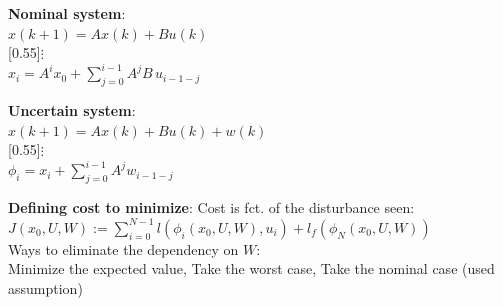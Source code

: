 \noindent
\begin{minipage}{\linewidth}
  \begin{minipage}[t]{0.48\linewidth}
    \vspace{0pt}
    \textbf{Nominal system}:\\
    \(x(k+1)=Ax(k)+Bu(k)\)\\[-1mm]
    \scalebox{1}[0.55]{\(\vdots\)}\\[-1mm]
    \(x_i=A^i x_0+\displaystyle\sum_{j=0}^{i-1}A^jB\,u_{i-1-j}\)
  \end{minipage}%
  \hfill
  \begin{minipage}[t]{0.48\linewidth}
    \vspace{0pt}
    \textbf{Uncertain system}:\\
    \(x(k+1)=Ax(k)+Bu(k)+w(k)\)\\[-1mm]
    \scalebox{1}[0.55]{\(\vdots\)}\\[-1mm]
    \(\phi_i=x_i+\displaystyle\sum_{j=0}^{i-1}A^j w_{i-1-j}\)
  \end{minipage}
\end{minipage}

\textbf{Defining cost to minimize}:
Cost is fct. of the disturbance seen:\\
$J(x_0,U,W):=\sum_{i=0}^{N-1}l(\phi_i(x_0,U,W),u_i)+l_f(\phi_N(x_0,U,W))$\\
Ways to eliminate the dependency on $W$:\\
\rightarrow Minimize the expected value, Take the worst case, Take the nominal case (used assumption)\\


